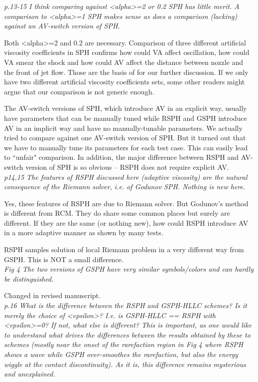 \documentclass[10pt,a4paper]{article}
\begin{document}
\textit{p.13-15 I think comparing against <alpha>=2 or 0.2 SPH has little merit.
A comparison to <alpha>=1 SPH makes sense as does a comparison (lacking)
against an AV-switch version of SPH.}

Both <alpha>=2 and 0.2 are necessary. Comparison of three different artificial viscosity coefficients in SPH confirms how could VA affect oscillation, how could VA smear the shock and how could AV affect the distance between nozzle and the front of jet flow. Those are the basis of for our further discussion. If we only have two different artificial viscosity coefficients sets, some other readers might argue that our comparison is not generic enough.

The AV-switch versions of SPH, which introduce AV in an explicit way, usually have parameters that can be manually tuned while RSPH and GSPH introduce AV in an implicit way and have no manually-tunable parameters. 
We actually tried to compare against one AV-switch version of SPH. But it turned out that we have to manually tune its parameters for each test case. This can easily lead to ``unfair" comparison. In addition, the major difference between RSPH and AV-switch version of SPH is so obvious -- RSPH does not require explicit AV.
\\[3pt]

\textit{p14,15 The features of RSPH discussed here (adaptive viscosity) are the
natural consequence of the Riemann solver, i.e. of Godunov SPH. Nothing
is new here.}

Yes, these features of RSPH are due to Riemann solver. 
But Godunov's method is different from RCM.
They do share some common places but surely are different. If they are the same (or nothing new), how could RSPH introduce AV in a more adaptive manner as shown by many tests.

RSPH samples solution of local Riemann problem in a very different way from GSPH. This is NOT a small difference.
\\[3pt]

\textit{Fig 4 The two versions of GSPH have very similar symbols/colors and can hardly be distinguished.}

Changed in revised manuscript. 
\\[3pt]

\textit{p.16 What is the difference between the RSPH and GSPH-HLLC schemes? Is it
merely the choice of <epsilon>? I.e. is GSPH-HLLC == RSPH with <epsilon>=0? If not, what else is different? This is important, as one would like to understand what drives the differences between the results obtained by these to schemes (mostly near
the onset of the rarefaction region in Fig 4 where RSPH shows a wave while GSPH over-smoothes the rarefaction, but also the energy wiggle at
the contact discontinuity). As it is, this difference remains mysterious and unexplained.}
\end{document}
